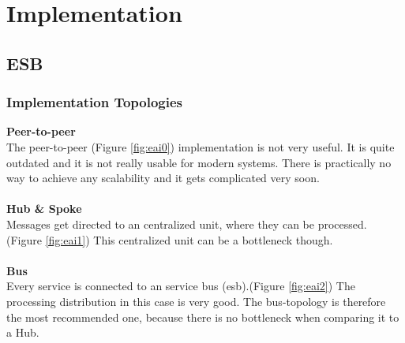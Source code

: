 \documentclass[12pt]{article}
\begin{document}

\newpage

\section{Implementation}
\subsection{ESB}
\label{sec:esb}

\subsubsection{Implementation Topologies}
\textbf{Peer-to-peer}\\
The peer-to-peer (Figure \ref{fig:eai0}) implementation is not very useful. It is quite outdated and it is not really usable for modern systems.
There is practically no way to achieve any scalability and it gets complicated very soon. \\\\
\textbf{Hub \& Spoke}\\
Messages get directed to an centralized unit, where they can be processed. (Figure \ref{fig:eai1}) This centralized unit can be a bottleneck though. \\\\
\textbf{Bus}\\
Every service is connected to an service bus (\gls{esb}).(Figure \ref{fig:eai2}) The processing distribution in this case is very good. The bus-topology is therefore the most recommended one, because there is no bottleneck when comparing it to a Hub.
\end{document}

